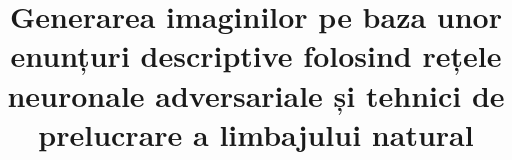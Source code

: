 \documentclass[conference, a4]{IEEEtran}
\begin{document}
\title{Generarea imaginilor pe baza unor enunțuri descriptive folosind rețele neuronale adversariale și tehnici de prelucrare a limbajului natural}\\



\maketitle











\printbibliography{}

\vspace{12pt}
\color{red}
\end{document}

